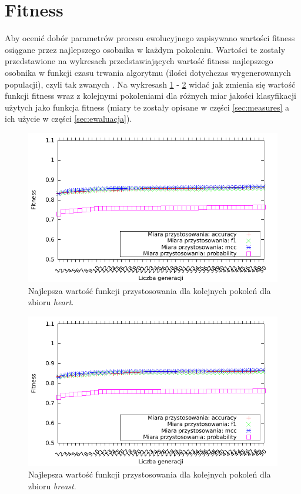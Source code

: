\FloatBarrier
\section{Fitness}
Aby ocenić dobór parametrów procesu ewolucyjnego zapisywano wartości fitness osiągane przez najlepszego osobnika w każdym pokoleniu. Wartości te zostały przedstawione na wykresach przedstawiających wartość fitness najlepszego osobnika w funkcji czasu trwania algorytmu (ilości dotychczas wygenerowanych populacji), czyli tak zwanych . Na wykresash \ref{fig:fit-heart} - \ref{fig:fit-breast} widać jak zmienia się wartość funkcji fitness wraz z kolejnymi pokoleniami dla różnych miar jakości klasyfikacji użytych jako funkcja fitness (miary te zostały opisane w części \ref{sec:measures} a ich użycie w części \ref{sec:ewaluacja}).

	\begin{figure}
		\includegraphics[scale=0.90]{figures/results/fitness/fitness-heart}
		\caption{Najlepsza wartość funkcji przystosowania dla kolejnych pokoleń dla zbioru \emph{heart}.\label{fig:fit-heart}}
	\end{figure}
	
	\begin{figure}
		\includegraphics[scale=0.90]{figures/results/fitness/fitness-breast}
		\caption{Najlepsza wartość funkcji przystosowania dla kolejnych pokoleń dla zbioru \emph{breast}.\label{fig:fit-breast}}
	\end{figure}	

